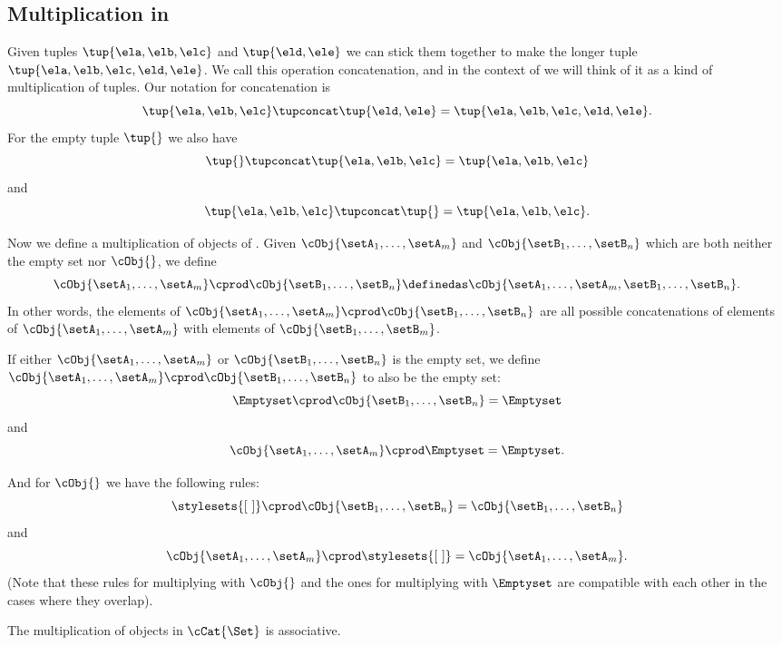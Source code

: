 \subsection{Multiplication in \cCat{\Set}}

Given tuples $\tup{\ela, \elb, \elc}$ and $\tup{\eld, \ele}$ we can stick them together to make the longer tuple$\tup{\ela, \elb, \elc, \eld, \ele}$.
We call this operation concatenation, and in the context of \cCat{\Set} we will think of it as a kind of multiplication of tuples.
Our notation for concatenation is
\begin{equation}
    \tup{\ela, \elb, \elc} \tupconcat \tup{\eld, \ele} = \tup{\ela, \elb, \elc, \eld, \ele}.
\end{equation}
For the empty tuple $\tup{  }$ we also have
\begin{equation}
    \tup{} \tupconcat \tup{\ela, \elb, \elc}  = \tup{\ela, \elb, \elc}
\end{equation}
and
\begin{equation}
    \tup{\ela, \elb, \elc}  \tupconcat \tup{ } = \tup{\ela, \elb, \elc}.
\end{equation}

Now we define a multiplication of objects of \cCat{\Set}.
Given $\cObj{\setA_1, \dots, \setA_m}$ and $\cObj{\setB_1,  \dots, \setB_n}$ which are both neither the empty set nor $\cObj{}$, we define
\begin{equation}
   \cObj{\setA_1, \dots, \setA_m} \cprod \cObj{\setB_1, \dots, \setB_n} \definedas \cObj{\setA_1, \dots, \setA_m, \setB_1,  \dots, \setB_n}.
\end{equation}
In other words, the elements of $\cObj{\setA_1, \dots, \setA_m} \cprod \cObj{\setB_1, \dots, \setB_n}$ are all possible concatenations of elements of $\cObj{\setA_1, \dots, \setA_m}$ with elements of $\cObj{\setB_1, \dots, \setB_m}$.

If either $\cObj{\setA_1, \dots, \setA_m}$ or $\cObj{\setB_1, \dots, \setB_n}$ is the empty set, we define $\cObj{\setA_1, \dots, \setA_m} \cprod \cObj{\setB_1, \dots, \setB_n}$ to also be the empty set:
\begin{equation}
    \Emptyset \cprod \cObj{\setB_1, \dots, \setB_n} = \Emptyset
\end{equation}
and
\begin{equation}
    \cObj{\setA_1, \dots, \setA_m} \cprod \Emptyset = \Emptyset.
\end{equation}

And for $\cObj{}$ we have the following rules:
\begin{equation}
    \stylesets{[ \ ]} \cprod \cObj{\setB_1, \dots, \setB_n} = \cObj{\setB_1,  \dots, \setB_n}
\end{equation}
and
\begin{equation}
    \cObj{\setA_1, \dots, \setA_m} \cprod \stylesets{[ \ ]} = \cObj{\setA_1, \dots, \setA_m}.
\end{equation}
(Note that these rules for multiplying with $\cObj{}$ and the ones for multiplying with $\Emptyset$ are compatible with each other in the cases where they overlap).

\begin{remark}
The multiplication of objects in $\cCat{\Set}$ is associative.
\end{remark}
